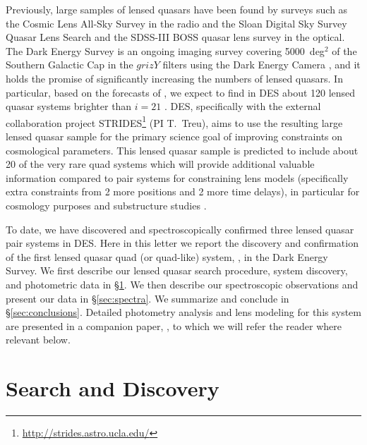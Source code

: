 \documentclass[twocolumn]{aastex6}
\begin{document}
Previously, large samples of lensed quasars have been found by surveys
such as the Cosmic Lens All-Sky Survey \citep[CLASS;][]{myers03,browne03}
in the radio and the Sloan Digital Sky Survey Quasar Lens Search 
\citep[SQLS;][]{oguri06,inada12} and the SDSS-III BOSS quasar lens survey 
\citep{more16} in the optical.
The Dark Energy Survey \citep[DES;][]{deswhitepaper,lahav16} is an ongoing imaging
survey covering 5000~deg$^2$ of the Southern Galactic Cap in the $grizY$
filters using the Dark Energy Camera \citep{flaugher15}, 
and it holds the promise of significantly increasing the numbers
of lensed quasars.
In particular, based on the forecasts of \cite{om10}, we expect to find in
DES about 120 lensed quasar systems brighter than $i = 21$
\citep[magnitude limit applies to the fainter image for pairs and third brightest image for quadruple systems, or quads; 
see Figure~1 of][]{ostrovski17}.  
DES, specifically with the external collaboration project 
STRIDES\footnote{\url{http://strides.astro.ucla.edu/}} (PI T.\ Treu),
aims to use the resulting large lensed quasar sample for the primary
science goal of improving constraints on cosmological parameters.
This lensed quasar sample is predicted to include about 20 of the very rare
quad systems which will provide 
additional valuable information compared to pair systems
for constraining lens models 
(specifically extra constraints from 2 more positions and 2 more time delays),
in particular for cosmology purposes
\citep[e.g.,][]{suyu13} and substructure studies \citep[e.g.,][]{dk02}.

To date, we have discovered and spectroscopically confirmed three lensed quasar
pair systems \citep{agn15b,ostrovski17} in DES.
Here in this letter we 
report the discovery and confirmation of the first lensed quasar quad 
(or quad-like) system, \sysname, in the Dark Energy Survey.
We first describe our lensed quasar search procedure, system discovery, and
photometric data in \S\ref{sec:search}.
We then describe our spectroscopic observations and present our data in 
\S\ref{sec:spectra}.
We summarize and conclude in \S\ref{sec:conclusions}.
Detailed photometry analysis and lens modeling for this system are presented in a companion 
paper, \cite{agn17}, to which we will refer the reader where relevant below.

\section{Search and Discovery}\label{sec:search}
\end{document}
